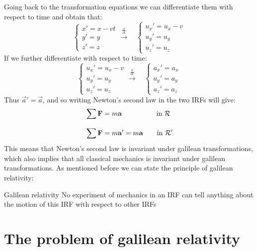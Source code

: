 Going back to the transformation equations we can differentiate them with respect to time and obtain that:
\begin{equation}
  \begin{cases}
    x' = x - vt\\[8pt]
    y' = y\\[8pt]
    z' = z
  \end{cases}
  \overset{\frac{\dd{}}{\dd{t}}}{\longrightarrow} \quad
  \begin{cases}
    u_x' = u_x - v\\[8pt]
    u_y' = u_y\\[8pt]
    u_z' = u_z
  \end{cases}
\end{equation}
If we further differentiate with respect to time:
\begin{equation}
  \begin{cases}
    u_x' = u_x - v\\[8pt]
    u_y' = u_y\\[8pt]
    u_z' = u_z
  \end{cases}
  \overset{\frac{\dd{}}{\dd{t}}}{\longrightarrow} \quad
  \begin{cases}
    a_x' = a_x\\[8pt]
    a_y' = a_y\\[8pt]
    a_z' = a_z
  \end{cases}
\end{equation}
Thus $\vec{a}' = \vec{a}$, and so writing Newton's second law in the two IRFs will give:
\begin{equation}
  \begin{split}
      &\displaystyle\sum \vb{F} = m \vb{a} \quad \quad \quad \quad \quad \text{in } \mathcal{R}\\[8pt]
      &\displaystyle\sum \vb{F} = m \vb{a}' = m \vb{a} \quad \quad \text{in } \mathcal{R'}
  \end{split}
\end{equation}
This means that Newton's second law is invariant under galilean transformations, which also implies that all classical mechanics is invariant under galilean transformations. As mentioned before we can state the principle of galilean relativity:
\begin{theorem}{Galilean relativity}
  No experiment of mechanics in an IRF can tell anything about the motion of this IRF with respect to other IRFs
\end{theorem}
\section{The problem of galilean relativity}
